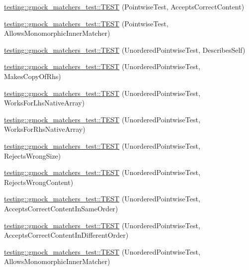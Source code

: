 \begin{DoxyCompactItemize}
\item 
\hyperlink{namespacetesting_1_1gmock__matchers__test_a42b98b370f1897cecfafbbfba53f4f38}{testing\+::gmock\+\_\+matchers\+\_\+test\+::\+T\+E\+ST} (Pointwise\+Test, Accepts\+Correct\+Content)
\item 
\hyperlink{namespacetesting_1_1gmock__matchers__test_a9bbef6d651166c37af32c54923bcd849}{testing\+::gmock\+\_\+matchers\+\_\+test\+::\+T\+E\+ST} (Pointwise\+Test, Allows\+Monomorphic\+Inner\+Matcher)
\item 
\hyperlink{namespacetesting_1_1gmock__matchers__test_af3307f88a321331155a146d49974e3e3}{testing\+::gmock\+\_\+matchers\+\_\+test\+::\+T\+E\+ST} (Unordered\+Pointwise\+Test, Describes\+Self)
\item 
\hyperlink{namespacetesting_1_1gmock__matchers__test_a05e9bbee9d19692f45a846c2ff45e016}{testing\+::gmock\+\_\+matchers\+\_\+test\+::\+T\+E\+ST} (Unordered\+Pointwise\+Test, Makes\+Copy\+Of\+Rhs)
\item 
\hyperlink{namespacetesting_1_1gmock__matchers__test_a57e330a5ae600f65d4daa2ed57bbc887}{testing\+::gmock\+\_\+matchers\+\_\+test\+::\+T\+E\+ST} (Unordered\+Pointwise\+Test, Works\+For\+Lhs\+Native\+Array)
\item 
\hyperlink{namespacetesting_1_1gmock__matchers__test_ae75a933b86db4c43a7bec2ffa97692ef}{testing\+::gmock\+\_\+matchers\+\_\+test\+::\+T\+E\+ST} (Unordered\+Pointwise\+Test, Works\+For\+Rhs\+Native\+Array)
\item 
\hyperlink{namespacetesting_1_1gmock__matchers__test_a50412d02c70f8303a087e6832d26ba62}{testing\+::gmock\+\_\+matchers\+\_\+test\+::\+T\+E\+ST} (Unordered\+Pointwise\+Test, Rejects\+Wrong\+Size)
\item 
\hyperlink{namespacetesting_1_1gmock__matchers__test_a9a9a85c6598ab74463703acbd01aa1a7}{testing\+::gmock\+\_\+matchers\+\_\+test\+::\+T\+E\+ST} (Unordered\+Pointwise\+Test, Rejects\+Wrong\+Content)
\item 
\hyperlink{namespacetesting_1_1gmock__matchers__test_aa68bf48e4a8fa41fcd60f59cc60ede8f}{testing\+::gmock\+\_\+matchers\+\_\+test\+::\+T\+E\+ST} (Unordered\+Pointwise\+Test, Accepts\+Correct\+Content\+In\+Same\+Order)
\item 
\hyperlink{namespacetesting_1_1gmock__matchers__test_a3d48732b4a6069cfcf5c0dde6027dad5}{testing\+::gmock\+\_\+matchers\+\_\+test\+::\+T\+E\+ST} (Unordered\+Pointwise\+Test, Accepts\+Correct\+Content\+In\+Different\+Order)
\item 
\hyperlink{namespacetesting_1_1gmock__matchers__test_af16d28a9f3a07b8ef2962b868b4f8399}{testing\+::gmock\+\_\+matchers\+\_\+test\+::\+T\+E\+ST} (Unordered\+Pointwise\+Test, Allows\+Monomorphic\+Inner\+Matcher)
\end{DoxyCompactItemize}
